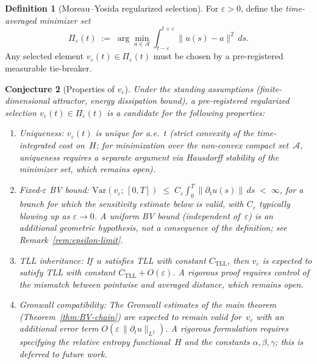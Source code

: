 \documentclass[12pt,a4paper]{article}
\theoremstyle{definition}
\newtheorem{definition}{Definition}[section]
\theoremstyle{plain}
\newtheorem{conjecture}[definition]{Conjecture}
\theoremstyle{remark}
\newcommand{\Var}{\mathrm{Var}}
\begin{document}
\begin{definition}[Moreau--Yosida regularized selection]
\label{def:my-selection}
For $\varepsilon > 0$, define the \emph{time-averaged minimizer set}
\[
  \Pi_\varepsilon(t)
  \;:=\;
  \arg\min_{a \in \mathcal{A}}
  \int_{t-\varepsilon}^{t+\varepsilon}
  \|u(s) - a\|^2 \, ds.
\]
Any selected element $v_\varepsilon(t)\in\Pi_\varepsilon(t)$ must be
chosen by a pre-registered measurable tie-breaker.
\end{definition}

\begin{conjecture}[Properties of $v_\varepsilon$]
\label{conj:bv-regularity}
Under the standing assumptions (finite-dimensional attractor, energy
dissipation bound), a pre-registered regularized selection
$v_\varepsilon(t)\in\Pi_\varepsilon(t)$ is a candidate for the
following properties:
\begin{enumerate}[label=(\roman*)]
\item \emph{Uniqueness:}  $v_\varepsilon(t)$ is unique for a.e.~$t$
  (strict convexity of the time-integrated cost on~$H$; for minimization
  over the non-convex compact set~$\mathcal{A}$, uniqueness requires
  a separate argument via Hausdorff stability of the minimizer set,
  which remains open).
\item \emph{Fixed-\(\varepsilon\) BV bound:}
  $\Var(v_\varepsilon;\,[0,T])
   \;\le\;
   C_\varepsilon
   \int_0^T \|\partial_t u(s)\|\,ds
   \;<\; \infty$,
  for a branch for which the sensitivity estimate below is valid,
  with $C_\varepsilon$ typically blowing up as
  $\varepsilon \to 0$.  A \emph{uniform} BV bound (independent
  of~$\varepsilon$) is an additional geometric hypothesis, not a
  consequence of the definition; see Remark~\ref{rem:epsilon-limit}.
\item \emph{TLL inheritance:}  If~$u$ satisfies TLL with constant
  $C_{\mathrm{TLL}}$, then $v_\varepsilon$ is expected to satisfy TLL with
  constant $C_{\mathrm{TLL}} + O(\varepsilon)$.  A rigorous proof
  requires control of the mismatch between pointwise and averaged
  distance, which remains open.
\item \emph{Gronwall compatibility:}  The Gronwall estimates of the
  main theorem (Theorem~\ref{thm:BV-chain}) are expected to remain valid
  for~$v_\varepsilon$ with an additional error term
  $O(\varepsilon\,\|\partial_t u\|_{L^2})$.  A rigorous formulation
  requires specifying the relative entropy functional~$H$ and the
  constants $\alpha, \beta, \gamma$; this is deferred to future work.
\end{enumerate}
\end{conjecture}
\end{document}

